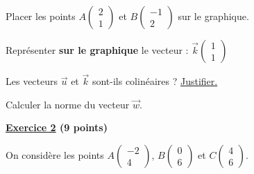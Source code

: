 \documentclass[12pt,a4paper]{exam}
\newcommand*{\Coord}[2]{%
  \ensuremath{
    \begin{pmatrix} 
      #1\\[5pt]
      #2 
    \end{pmatrix}}}
\begin{document}
\vspace{5pt}
\begin{questions}

\question[0,5] Placer les points $A\Coord{2}{1}$ et $B\Coord{-1}{2}$ sur le graphique.

\vspace{10pt}

\question
{}

\question[1] Représenter \textbf{sur le graphique} le vecteur : $\overrightarrow{k}\Coord{1}{1}$

\question[2] Les vecteurs $\overrightarrow{u}$ et $\overrightarrow{k}$ sont-ils colinéaires ? 
\underline{Justifier.}

\question[1] Calculer la norme du vecteur $\overrightarrow{w}$.



\end{questions}

\vspace{1cm}


\textbf{\underline{Exercice 2} (9 points)}

On considère les points $A\Coord{-2}{4}$, $B\Coord{0}{6}$ et $C\Coord{4}{6}$.
\end{document}
